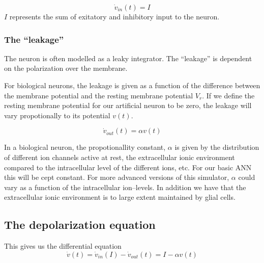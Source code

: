 \begin{equation}
	\dot{v}_{in}(t) = I
\end{equation}
$I$ represents the sum of exitatory and inhibitory input to the neuron.



\subsubsection{The ``leakage''}
The neuron is often modelled as a leaky integrator. The ``leakage'' is dependent on the polarization over the membrane. 

For biological neurons, the leakage is given as a function of the difference between the membrane potential and the resting membrane potential $V_r$. 
If we define the resting membrane potential for our artificial neuron to be zero, the leakage will vary propotionally to its potential $v(t)$.

\begin{equation}
	\dot{v}_{out}(t) = \alpha v(t)
\end{equation}

In a biological neuron, the propotionallity constant, $\alpha$ is given by the distribution of different ion channels active at rest, the extracellular ionic environment compared to the intracellular level of the different ions, etc.
For our basic ANN this will be cept constant. For more advanced versions of this simulator, $\alpha$ could vary as a function of the intracellular ion--levels. 
In addition we have that the extracellular ionic environment is to large extent maintained by glial cells.


\subsection{The depolarization equation}%
This gives us the differential equation 
\begin{equation}
	\dot{v}(t) = \dot{v}_{in}(I) - \dot{v}_{out}(t) = I - \alpha v(t)
\end{equation}

